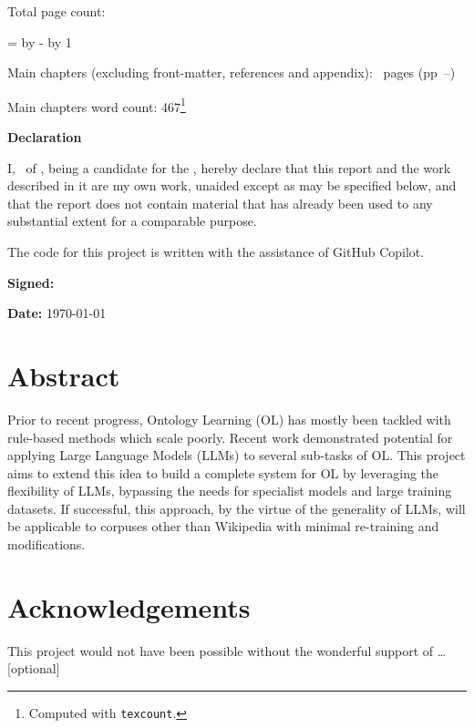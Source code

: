 \begin{sffamily}
\begin{titlepage}
        \makeatother
    \end{titlepage}

    \newpage

    Total page count: \pageref{lastpage}

    \makeatletter
    \@tempcnta=\relax%
    \advance\@tempcnta by -%
    \advance\@tempcnta by 1%
    \xdef\contentpages{\the\@tempcnta}%
    \makeatother

    Main chapters (excluding front-matter, references and appendix):
    \contentpages~pages
    (pp~\pageref{firstcontentpage}--\pageref{lastcontentpage})

    Main chapters word count: 467\footnote{Computed with \texttt{texcount}.}

\end{sffamily}

\vspace{\fill}
\onehalfspacing
\ifsubmission\else\makeatletter
    \textbf{\Huge Declaration}
    \vspace{40pt}

    I, \@author\ of \college, being a candidate for the \course, hereby
    declare that this report and the work described in it are my own work,
    unaided except as may be specified below, and that the report does not
    contain material that has already been used to any substantial extent
    for a comparable purpose.

    The code for this project is written with the assistance of GitHub Copilot.

    \bigskip
    \textbf{Signed:} \@author

    \bigskip
    \textbf{Date:} \today
    \vspace{\fill}
    \makeatother\fi

\chapter*{Abstract}

Prior to recent progress, Ontology Learning (OL) has mostly been tackled with rule-based methods which scale poorly. Recent work demonstrated potential for applying Large Language Models (LLMs) to several sub-tasks of OL. This project aims to extend this idea to build a complete system for OL by leveraging the flexibility of LLMs, bypassing the needs for specialist models and large training datasets. If successful, this approach, by the virtue of the generality of LLMs, will be applicable to corpuses other than Wikipedia with minimal re-training and modifications.

\ifsubmission\else

    \chapter*{Acknowledgements}

    This project would not have been possible without the wonderful
    support of \ldots [optional]

\fi
\cleardoublepage %